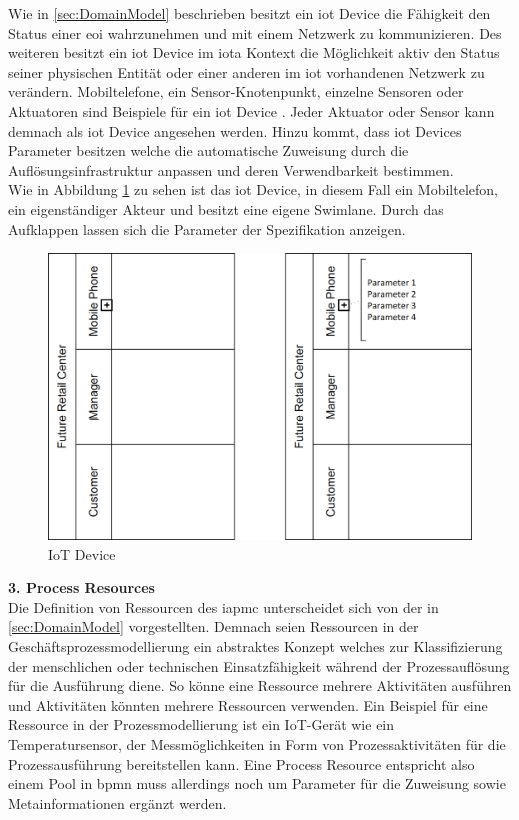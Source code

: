 \documentclass[a4paper, 12pt, twoside, headsepline=true]{scrartcl} %
\begin{document}
Wie in \ref{sec:DomainModel} beschrieben besitzt ein \ac{iot} Device die Fähigkeit den Status einer \ac{eoi} wahrzunehmen und mit einem Netzwerk zu kommunizieren. Des weiteren besitzt ein \ac{iot} Device im \ac{iota} Kontext die Möglichkeit aktiv den Status seiner physischen Entität oder einer anderen im \ac{iot} vorhandenen Netzwerk zu verändern. Mobiltelefone, ein Sensor-Knotenpunkt, einzelne Sensoren oder Aktuatoren sind Beispiele für ein \ac{iot} Device \cite[S.50]{conceptsiotawarepm}. Jeder Aktuator oder Sensor kann demnach als \ac{iot} Device angesehen werden. Hinzu kommt, dass \ac{iot} Devices Parameter besitzen welche die automatische Zuweisung durch die Auflösungsinfrastruktur anpassen und deren Verwendbarkeit bestimmen. \\
Wie in Abbildung \ref{fig:iotdevice} zu sehen ist das \ac{iot} Device, in diesem Fall ein Mobiltelefon, ein eigenständiger Akteur und besitzt eine eigene Swimlane. Durch das Aufklappen lassen sich die Parameter der Spezifikation anzeigen.

\begin{figure}[H]
	\includegraphics[height=7 cm,keepaspectratio,center]{figures/IoTDevice}
	\caption{IoT Device \cite[S.53]{conceptsiotawarepm}}
	\label{fig:iotdevice}
\end{figure} 

\textbf{3. Process Resources}\\

Die Definition von Ressourcen des \ac{iapmc} unterscheidet sich von der in \ref{sec:DomainModel} vorgestellten. Demnach seien Ressourcen in der Geschäftsprozessmodellierung ein abstraktes Konzept welches zur Klassifizierung der menschlichen oder technischen Einsatzfähigkeit während der Prozessauflösung für die Ausführung diene. So könne eine Ressource mehrere Aktivitäten ausführen und Aktivitäten könnten mehrere Ressourcen verwenden. Ein Beispiel für eine Ressource in der Prozessmodellierung ist ein IoT-Gerät wie ein Temperatursensor, der Messmöglichkeiten in Form von Prozessaktivitäten für die Prozessausführung bereitstellen kann\cite[S.54]{conceptsiotawarepm}. Eine Process Resource entspricht also einem Pool in \ac{bpmn} muss allerdings noch um Parameter für die Zuweisung sowie Metainformationen ergänzt werden.
\\
\end{document}

